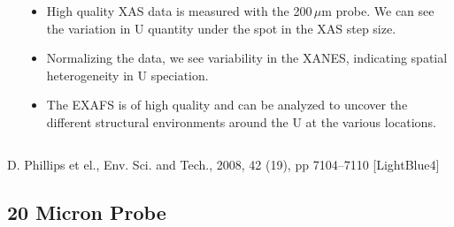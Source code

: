 \documentclass[10pt, xcolor=x11names, compress]{beamer}
\begin{document}
\begin{frame}
\begin{columns}[T]
\begin{column}{0.34\linewidth}
    \end{column}
    \begin{column}{0.66\linewidth}
      \begin{itemize}[<+->]
      \item High quality XAS data is measured with the 200\,$\mu$m
        probe.  We can see the variation in U quantity under the spot
        in the XAS step size.\\[10ex]
      \item Normalizing the data, we see variability in the XANES,
        indicating spatial heterogeneity in U speciation.\\[10ex]
      \item The EXAFS is of high quality and can be analyzed to
        uncover the different structural environments around the U at
        the various locations.
      \end{itemize}
    \end{column}
  \end{columns}
  \begin{bottomnote}[0.5][19.75]
    D. Phillips et el., Env. Sci. and Tech., 2008, 42 (19), pp
    7104–7110
    [LightBlue4]
  \end{bottomnote}
\end{frame}

\subsection[20 $\mu$m]{20 Micron Probe}
\end{document}
